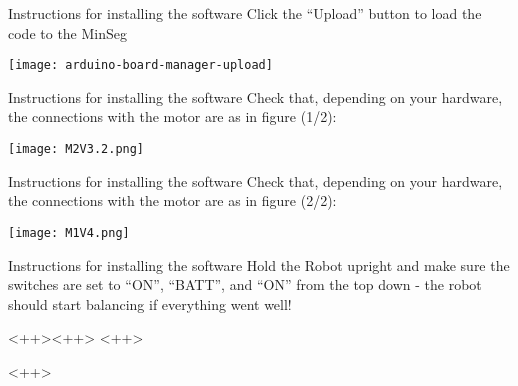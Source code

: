 \begin{frame}{Instructions for installing the software}
	Click the ``Upload'' button to load the code to the MinSeg
	\begin{center}
		\texttt{[image: arduino-board-manager-upload]}
	\end{center}
\end{frame}


\begin{frame}{Instructions for installing the software}
	Check that, depending on your hardware, the connections with the motor are as in figure (1/2):
	\begin{center}
		\texttt{[image: M2V3.2.png]}
	\end{center}
\end{frame}


\begin{frame}{Instructions for installing the software}
	Check that, depending on your hardware, the connections with the motor are as in figure (2/2):
	\begin{center}
		\texttt{[image: M1V4.png]}
	\end{center}
\end{frame}


\begin{frame}{Instructions for installing the software}
	Hold the Robot upright and make sure the switches are set to ``ON'', ``BATT'', and ``ON'' from the top down - the robot should start balancing if everything went well!
\end{frame}




\begin{frame}{<++>}{<++>}
	<++>
	\note<1-1>{\begin{itemize}
		\item <++>
	\end{itemize}}
\end{frame}
<++>



